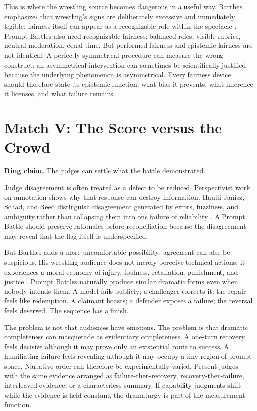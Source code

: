 \documentclass[11pt]{article}
\newcommand{\ringclaim}[1]{\vspace{0.35em}\noindent\textbf{Ring claim.} #1\vspace{0.15em}}
\begin{document}
This is where the wrestling source becomes dangerous in a useful way. Barthes emphasizes that wrestling's signs are deliberately excessive and immediately legible; fairness itself can appear as a recognizable role within the spectacle \cite{barthes1972wrestling}. Prompt Battles also need recognizable fairness: balanced roles, visible rubrics, neutral moderation, equal time. But performed fairness and epistemic fairness are not identical. A perfectly symmetrical procedure can measure the wrong construct; an asymmetrical intervention can sometimes be scientifically justified because the underlying phenomenon is asymmetrical. Every fairness device should therefore state its epistemic function: what bias it prevents, what inference it licenses, and what failure remains.

\section{Match V: The Score versus the Crowd}
\ringclaim{The judges can settle what the battle demonstrated.}

Judge disagreement is often treated as a defect to be reduced. Perspectivist work on annotation shows why that response can destroy information. Hautli-Janisz, Schad, and Reed distinguish disagreement generated by errors, fuzziness, and ambiguity rather than collapsing them into one failure of reliability \cite{hautli2022disagreement}. A Prompt Battle should preserve rationales before reconciliation because the disagreement may reveal that the flag itself is underspecified.

But Barthes adds a more uncomfortable possibility: agreement can also be suspicious. His wrestling audience does not merely perceive technical actions; it experiences a moral economy of injury, foulness, retaliation, punishment, and justice \cite{barthes1972wrestling}. Prompt Battles naturally produce similar dramatic forms even when nobody intends them. A model fails publicly; a challenger corrects it; the repair feels like redemption. A claimant boasts; a defender exposes a failure; the reversal feels deserved. The sequence has a finish.

The problem is not that audiences have emotions. The problem is that dramatic completeness can masquerade as evidentiary completeness. A one-turn recovery feels decisive although it may prove only an existential route to success. A humiliating failure feels revealing although it may occupy a tiny region of prompt space. Narrative order can therefore be experimentally varied. Present judges with the same evidence arranged as failure-then-recovery, recovery-then-failure, interleaved evidence, or a characterless summary. If capability judgments shift while the evidence is held constant, the dramaturgy is part of the measurement function.
\end{document}
